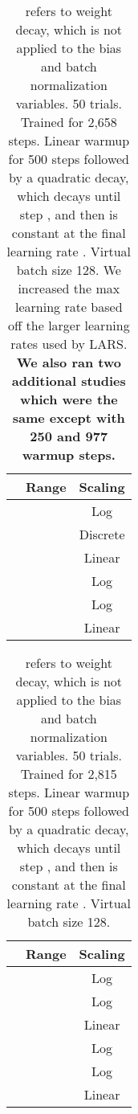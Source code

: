 \documentclass{article}
\begin{document}
\begin{table}[t]
\centering
\setlength{\extrarowheight}{3.5pt}
\begin{tabular}{|c|c|c|}
\hline
 & Range & Scaling \\ \hline
 &  & Log \\ \hline
 &  & Discrete \\ \hline
 &  & Linear \\ \hline
 &  & Log \\ \hline
 &  & Log \\ \hline
 &  & Linear \\ \hline
\end{tabular}
\caption{ refers to weight decay, which is not applied to the bias and batch normalization variables. 50 trials. Trained for 2,658 steps. Linear warmup for 500 steps followed by a quadratic decay, which decays until step , and then is constant at the final learning rate . Virtual batch size 128. We increased the max learning rate based off the larger learning rates used by LARS. \textbf{We also ran two additional studies which were the same except with 250 and 977 warmup steps.}}
\end{table}


\begin{table}[t]
\centering
\setlength{\extrarowheight}{3.5pt}
\begin{tabular}{|c|c|c|}
\hline
 & Range & Scaling \\ \hline
 &  & Log \\ \hline
 &  & Log \\ \hline
 &  & Linear \\ \hline
 &  & Log \\ \hline
 &  & Log \\ \hline
 &  & Linear \\ \hline
\end{tabular}
\caption{ refers to weight decay, which is not applied to the bias and batch normalization variables. 50 trials. Trained for 2,815 steps. Linear warmup for 500 steps followed by a quadratic decay, which decays until step , and then is constant at the final learning rate . Virtual batch size 128.}
\end{table}
\end{document}
